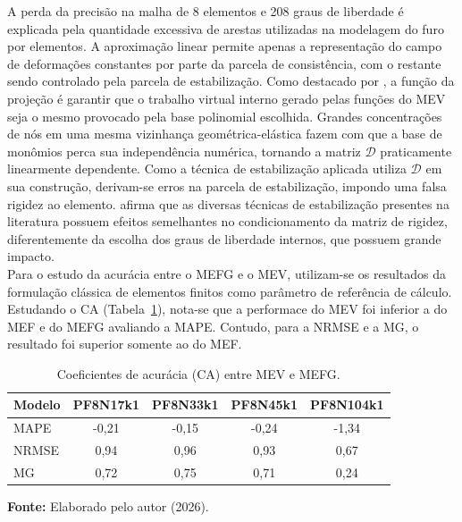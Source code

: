 \indent A perda da precisão na malha de 8 elementos e 208 graus de liberdade é explicada pela quantidade excessiva de arestas utilizadas na modelagem do furo por elementos. A aproximação linear permite apenas a representação do campo de deformações constantes por parte da parcela de consistência, com o restante sendo controlado pela parcela de estabilização. Como destacado por \citet{engineeringperspectivevirtualelementmethoditsinterplaystandardfiniteelementmethod2019a}, a função da projeção é garantir que o trabalho virtual interno gerado pelas funções do MEV seja o mesmo provocado pela base polinomial escolhida. Grandes concentrações de nós em uma mesma vizinhança geométrica-elástica fazem com que a base de monômios perca sua independência numérica, tornando a matriz $\mathcal{D}$ praticamente linearmente dependente. Como a técnica de estabilização aplicada utiliza $\mathcal{D}$ em sua construção, derivam-se erros na parcela de estabilização, impondo uma falsa rigidez ao elemento. \citet{illconditioningvirtualelementmethodstabilizationsbases2018} afirma que as diversas técnicas de estabilização presentes na literatura possuem efeitos semelhantes no condicionamento da matriz de rigidez, diferentemente da escolha dos graus de liberdade internos, que possuem grande impacto.\\
\indent Para o estudo da acurácia entre o MEFG e o MEV, utilizam-se os resultados da formulação clássica de elementos finitos como parâmetro de referência de cálculo. Estudando o CA (Tabela~\ref{tab:5.8}), nota-se que a performace do MEV foi inferior a do MEF e do MEFG avaliando a MAPE. Contudo, para a NRMSE e a MG, o resultado foi superior somente ao do MEF.

\begin{table}[htbp]
    \centering
    \caption{Coeficientes de acurácia (CA) entre MEV e MEFG.}
    \label{tab:5.8}
    \small %
    \begin{tabular}{lcccc}
        \toprule
        \textbf{Modelo} & \textbf{PF8N17k1} & \textbf{PF8N33k1} & \textbf{PF8N45k1} & \textbf{PF8N104k1} \\
        \midrule
        MAPE  & -0,21 & -0,15 & -0,24 & -1,34 \\
        NRMSE &  0,94 &  0,96 &  0,93 &  0,67 \\
        MG    &  0,72 &  0,75 &  0,71 &  0,24 \\
        \bottomrule
    \end{tabular}
    
    \vspace{0.2cm}
    \raggedright
    \textbf{Fonte:} Elaborado pelo autor (2026).
\end{table}

